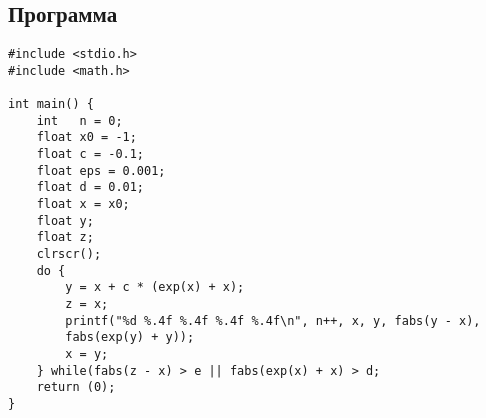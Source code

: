 \hypertarget{ux43fux440ux43eux433ux440ux430ux43cux43cux430}{%
\subsection{Программа}\label{ux43fux440ux43eux433ux440ux430ux43cux43cux430}}

\begin{verbatim}
#include <stdio.h>
#include <math.h>

int main() {
    int   n = 0;
    float x0 = -1;
    float c = -0.1;
    float eps = 0.001;
    float d = 0.01;
    float x = x0;
    float y;
    float z;
    clrscr();
    do {
        y = x + c * (exp(x) + x);
        z = x;
        printf("%d %.4f %.4f %.4f %.4f\n", n++, x, y, fabs(y - x),
        fabs(exp(y) + y));
        x = y;
    } while(fabs(z - x) > e || fabs(exp(x) + x) > d;
    return (0);
}
\end{verbatim}
